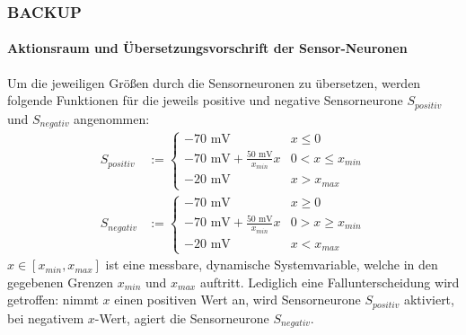 \documentclass[10pt,t,aspectratio=1610]{beamer}
\newcommand{\ChapterBackup}{BACKUP}
\begin{document}
\begin{frame}
	\frametitle{\ChapterBackup}
	\framesubtitle{Aktionsraum und Übersetzungsvorschrift der Sensor-Neuronen}
	\vspace{0.3cm}
	Um die jeweiligen Größen durch die Sensorneuronen zu übersetzen, werden folgende Funktionen für die jeweils positive und negative Sensorneurone $S_{positiv}$ und $S_{negativ}$ angenommen:
	\begin{align}
	\label{eq:sensor_translation_p}
	S_{positiv} &:= \begin{cases}-70\text{ mV} & x\leq 0\\-70\text{ mV} + \frac{50\text{ mV}}{x_{min}}x & 0 < x \leq x_{min} \\-20\text{ mV} & x > x_{max}  \end{cases}\\
	\label{eq:sensor_translation_n}
	S_{negativ} &:= \begin{cases}-70\text{ mV} & x\geq 0\\-70\text{ mV} + \frac{50\text{ mV}}{x_{min}}x & 0 > x \geq x_{min} \\-20\text{ mV} & x < x_{max}  \end{cases}
	\end{align}
	$x\in[x_{min}, x_{max}]$ ist eine messbare, dynamische Systemvariable, welche in den gegebenen Grenzen $x_{min} $ und $x_{max}$ auftritt. Lediglich eine Fallunterscheidung wird getroffen: nimmt $x$ einen positiven Wert an, wird Sensorneurone $S_{positiv}$ aktiviert, bei negativem $x$-Wert, agiert die Sensorneurone $S_{negativ}$.
\end{frame}


\ClosingSlide
\end{document}
